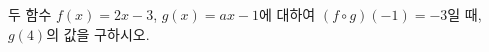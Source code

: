 \hspace*{2mm}\begin{minipage}[t]{\dimexpr\linewidth-2mm\relax}\vspace{0pt}
두 함수 $f(x)=2x-3$, $g(x)=ax-1$에 대하여 $(f\circ g)(-1)=-3$일 때, $g(4)$의 값을 구하시오. \end{minipage}

